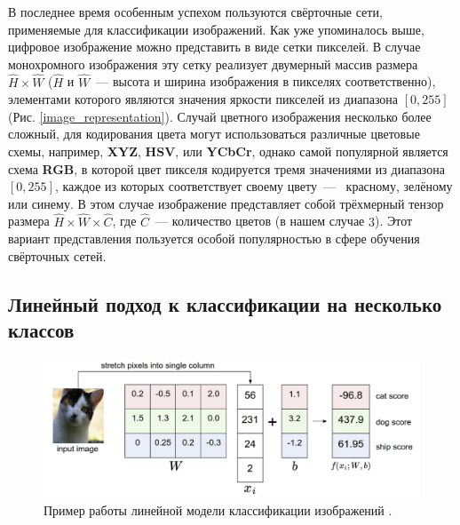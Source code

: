 \documentclass[12pt, fleqn]{article}
\begin{document}
    В последнее время особенным успехом пользуются свёрточные сети, применяемые для классификации изображений. Как уже упоминалось выше, 
    цифровое изображение можно представить в виде сетки пикселей. В случае монохромного изображения эту сетку реализует двумерный 
    массив размера $\hat{H} \times \hat{W}$ ($\hat{H}$ и $\hat{W}$~--- высота и ширина изображения в пикселях соответственно), элементами которого являются 
    значения яркости пикселей из диапазона $[0, 255]$ (Рис. \ref{image_representation}). Случай 
    цветного изображения несколько более сложный, для кодирования цвета могут использоваться различные цветовые схемы, например, \textbf{XYZ}, 
    \textbf{HSV}, или \textbf{YCbCr}, однако самой популярной является схема \textbf{RGB}, в которой цвет пикселя кодируется тремя 
    значениями из диапазона $[0, 255]$, каждое из которых соответствует своему цвету~---  красному, зелёному или синему. 
    В этом случае изображение представляет собой трёхмерный тензор размера $\hat{H} \times \hat{W} \times \hat{C}$, где $\hat{C}$~--- количество цветов 
    (в нашем случае $3$). Этот вариант представления пользуется особой популярностью в сфере обучения свёрточных сетей.

    \subsection{Линейный подход к классификации на несколько классов} \label{linear_section}

    \begin{figure}[ht]
        \centering
        \includegraphics[scale=0.5]{pics/linear_classification.png}
        \caption{Пример работы линейной модели классификации изображений \cite{cs231n}.}
        \label{linear_classification}
    \end{figure}
\end{document}
